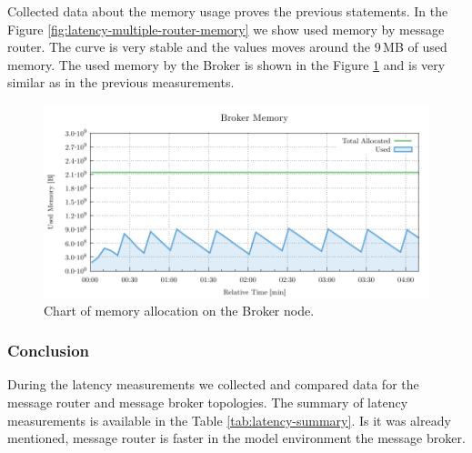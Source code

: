Collected data about the memory usage proves the previous statements. In the Figure \ref{fig:latency-multiple-router-memory} we show used memory by message router. The curve is very stable and the values moves around the 9\,MB of used memory. The used memory by the Broker is shown in the Figure \ref{fig:latency-multiple-broker-memory} and is very similar as in the previous measurements.

\begin{figure}[H]
	\centering
	\includegraphics[width=1\linewidth]{obrazky-figures/charts/multipoint-router-broker-latency-memory.pdf}
	\caption{Chart of memory allocation on the Broker node.}
	\label{fig:latency-multiple-broker-memory}
\end{figure}

\subsubsection*{Conclusion}
\enlargethispage{2em}
During the latency measurements we collected and compared data for the message router and message broker topologies. The summary of latency measurements is available in the Table \ref{tab:latency-summary}. Is it was already mentioned, message router is faster in the model environment the message broker.

